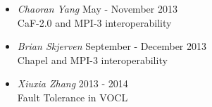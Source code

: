 \begin{itemize}
    \item{\sl Chaoran Yang} \hfill May - November 2013 \\
        CaF-2.0 and MPI-3 interoperability \\
    \item{\sl Brian Skjerven} \hfill September - December 2013 \\
        Chapel and MPI-3 interoperability \\
    \item{\sl Xiuxia Zhang} \hfill 2013 - 2014 \\
        Fault Tolerance in VOCL \\
\end{itemize}
